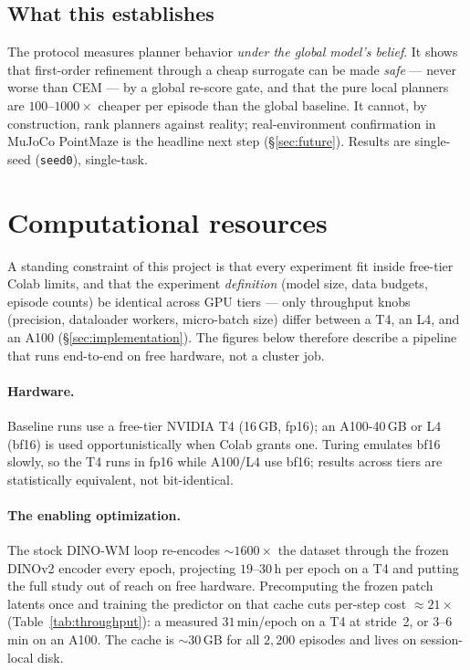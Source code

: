 \documentclass[11pt,a4paper]{article}
\begin{document}
\subsection{What this establishes}
The protocol measures planner behavior \emph{under the global model's belief}.
It shows that first-order refinement through a cheap surrogate can be made
\emph{safe} --- never worse than CEM --- by a global re-score gate, and that the
pure local planners are $100$--$1000\times$ cheaper per episode than the global
baseline. It cannot, by construction, rank planners against reality;
real-environment confirmation in MuJoCo PointMaze is the headline next step
(\S\ref{sec:future}). Results are single-seed (\texttt{seed0}), single-task.

\section{Computational resources}
\label{sec:resources}

A standing constraint of this project is that every experiment fit inside
free-tier Colab limits, and that the experiment \emph{definition} (model size,
data budgets, episode counts) be identical across GPU tiers --- only throughput
knobs (precision, dataloader workers, micro-batch size) differ between a T4, an
L4, and an A100 (\S\ref{sec:implementation}). The figures below therefore
describe a pipeline that runs end-to-end on free hardware, not a cluster job.

\paragraph{Hardware.} Baseline runs use a free-tier NVIDIA T4 (16\,GB, fp16); an
A100-40\,GB or L4 (bf16) is used opportunistically when Colab grants one. Turing
emulates bf16 slowly, so the T4 runs in fp16 while A100/L4 use bf16; results
across tiers are statistically equivalent, not bit-identical.

\paragraph{The enabling optimization.} The stock DINO-WM loop re-encodes
${\sim}1600\times$ the dataset through the frozen DINOv2 encoder every epoch,
projecting $19$--$30$\,h per epoch on a T4 and putting the full study out of
reach on free hardware. Precomputing the frozen patch latents once and training
the predictor on that cache cuts per-step cost ${\approx}21\times$
(Table~\ref{tab:throughput}): a measured $31$\,min/epoch on a T4 at stride~2, or
$3$--$6$\,min on an A100. The cache is ${\sim}30$\,GB for all $2{,}200$ episodes
and lives on session-local disk.
\end{document}
